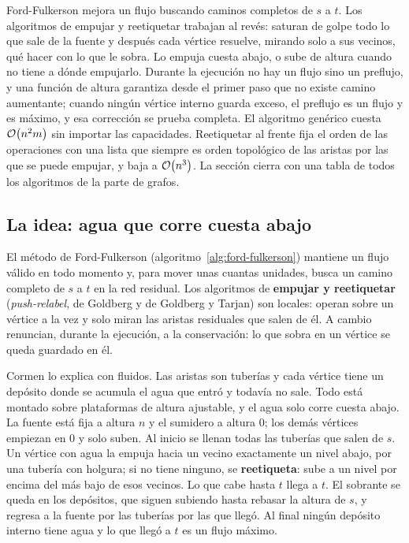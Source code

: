 \documentclass[11pt,letterpaper]{article}
\begin{document}
\begin{quick_sum}
  Ford-Fulkerson mejora un flujo buscando caminos completos de $s$ a
  $t$. Los algoritmos de empujar y reetiquetar trabajan al revés:
  saturan de golpe todo lo que sale de la fuente y después cada
  vértice resuelve, mirando solo a sus vecinos, qué hacer con lo que le
  sobra. Lo empuja cuesta abajo, o sube de altura cuando no tiene a
  dónde empujarlo. Durante la ejecución no hay un flujo sino un
  preflujo, y una función de altura garantiza desde el primer paso que
  no existe camino aumentante; cuando ningún vértice interno guarda
  exceso, el preflujo es un flujo y es máximo, y esa corrección se
  prueba completa. El algoritmo genérico cuesta $\mathcal{O}\!\left(n^2 m\right)$ sin
  importar las capacidades. Reetiquetar al frente fija el orden de las
  operaciones con una lista que siempre es orden topológico de las
  aristas por las que se puede empujar, y baja a $\mathcal{O}\!\left(n^3\right)$. La
  sección cierra con una tabla de todos los algoritmos de la parte de
  grafos.
\end{quick_sum}


\subsection*{La idea: agua que corre cuesta abajo}

El método de Ford-Fulkerson (algoritmo~\ref{alg:ford-fulkerson})
mantiene un flujo válido en todo momento y, para mover unas cuantas
unidades, busca un camino completo de $s$ a $t$ en la red residual.
Los algoritmos de \textbf{empujar y reetiquetar}
(\textit{push-relabel}, de Goldberg y de Goldberg y Tarjan) son
locales: operan sobre un vértice a la vez y solo miran las aristas
residuales que salen de él. A cambio renuncian, durante la ejecución,
a la conservación: lo que sobra en un vértice se queda guardado en él.

Cormen lo explica con fluidos. Las aristas son tuberías y cada vértice
tiene un depósito donde se acumula el agua que entró y todavía no
sale. Todo está montado sobre plataformas de altura ajustable, y el
agua solo corre cuesta abajo. La fuente está fija a altura $n$ y el
sumidero a altura $0$; los demás vértices empiezan en $0$ y solo
suben. Al inicio se llenan todas las tuberías que salen de $s$. Un
vértice con agua la empuja hacia un vecino exactamente un nivel abajo,
por una tubería con holgura; si no tiene ninguno, se
\textbf{reetiqueta}: sube a un nivel por encima del más bajo de esos
vecinos. Lo que cabe hasta $t$ llega a $t$. El sobrante se queda en
los depósitos, que siguen subiendo hasta rebasar la altura de $s$, y
regresa a la fuente por las tuberías por las que llegó. Al final
ningún depósito interno tiene agua y lo que llegó a $t$ es un flujo
máximo.
\end{document}
